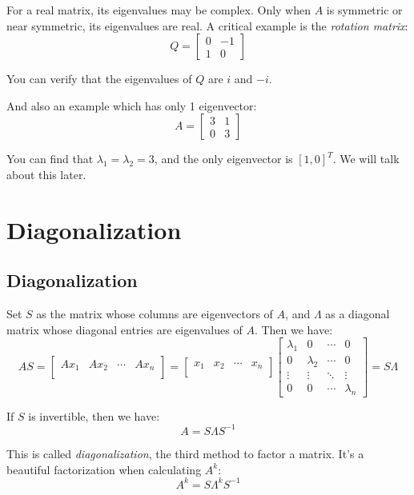 \documentclass[10pt,a4paper,oneside,numbers=noenddot]{scrbook}
\theoremstyle{ctplain}
\theoremstyle{ctresult}
\begin{document}
For a real matrix, its eigenvalues may be complex. Only when $A$ is symmetric or near
symmetric, its eigenvalues are real. A critical example is the \emph{rotation matrix}:
\[
  Q = \begin{bmatrix}
    0 & -1 \\
    1 & 0
  \end{bmatrix}
\]

You can verify that the eigenvalues of $Q$ are $i$ and $-i$.

And also an example which has only 1 eigenvector:
\[
  A = \begin{bmatrix}
    3 & 1 \\
    0 & 3
  \end{bmatrix}
\]

You can find that $\lambda_1 = \lambda_2 = 3$, and the only eigenvector is
$[1, 0]^T$. We will talk about this later.

\section{Diagonalization}
\subsection{Diagonalization}

Set $S$ as the matrix whose columns are eigenvectors of $A$, and $\Lambda$ as a diagonal
matrix whose diagonal entries are eigenvalues of $A$. Then we have:
\[
  AS = \begin{bmatrix}
    Ax_1 & Ax_2 & \cdots & Ax_n \\
  \end{bmatrix} =
  \begin{bmatrix}
    x_1 & x_2 & \cdots & x_n \\
  \end{bmatrix}
  \begin{bmatrix}
    \lambda_1 & 0 & \cdots & 0 \\
    0 & \lambda_2 & \cdots & 0 \\
    \vdots & \vdots & \ddots & \vdots \\
    0 & 0 & \cdots & \lambda_n
  \end{bmatrix} = S\Lambda
\]

If $S$ is invertible, then we have:
\[
  A = S\Lambda S^{-1}
\]

This is called \emph{diagonalization}, the third method to factor a matrix. It's a
beautiful factorization when calculating $A^k$:
\[
  A^k = S\Lambda^k S^{-1}
\]
\end{document}
